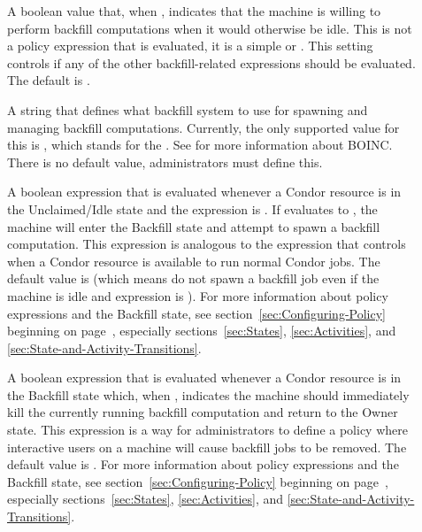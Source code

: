 \begin{description}

\item[] \label{param:EnableBackfill} A boolean
  value that, when , indicates that the machine is willing
  to perform backfill computations when it would otherwise be idle.
  This is not a policy expression that is evaluated, it is a simple
   or .
  This setting controls if any of the other backfill-related
  expressions should be evaluated.
  The default is .

\item[] \label{param:BackfillSystem} A string
  that defines what backfill system to use for spawning and managing
  backfill computations.
  Currently, the only supported value for this is , which
  stands for the .
  See  for more information about
  BOINC.
  There is no default value, administrators must define this.
  
\item[] \label{param:StartBackfill} A boolean
  expression that is evaluated whenever a Condor resource is in the
  Unclaimed/Idle state and the  expression
  is .  
  If  evaluates to , the machine
  will enter the Backfill state and attempt to spawn a backfill
  computation. 
  This expression is analogous to the  expression that
  controls when a Condor resource is available to run normal Condor
  jobs.
  The default value is  (which means do not spawn a
  backfill job even if the machine is idle and
   expression is ).
  For more information about policy expressions and the Backfill
  state, see section~\ref{sec:Configuring-Policy} beginning on
  page~\pageref{sec:Configuring-Policy}, especially
  sections~\ref{sec:States}, \ref{sec:Activities}, and
  \ref{sec:State-and-Activity-Transitions}.

\item[] \label{param:EvictBackfill} A boolean
  expression that is evaluated whenever a Condor resource is in the
  Backfill state which, when , indicates the machine should
  immediately kill the currently running backfill computation and
  return to the Owner state.
  This expression is a way for administrators to define a policy where
  interactive users on a machine will cause backfill jobs to be
  removed.
  The default value is .
  For more information about policy expressions and the Backfill
  state, see section~\ref{sec:Configuring-Policy} beginning on
  page~\pageref{sec:Configuring-Policy}, especially
  sections~\ref{sec:States}, \ref{sec:Activities}, and
  \ref{sec:State-and-Activity-Transitions}.

\end{description}


